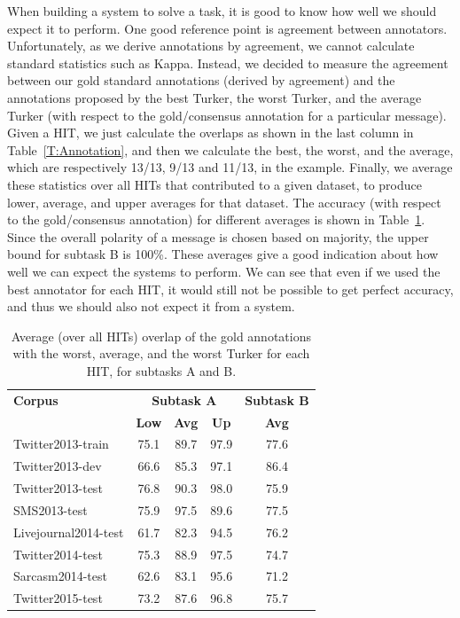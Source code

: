 \documentclass[11pt]{article}
\begin{document}
When building a system to solve a task, it is good to know how well we should expect it to perform. One good reference point is agreement between annotators. Unfortunately, as we derive annotations by agreement, we cannot calculate standard statistics such as Kappa. Instead, we decided to measure the agreement between our gold standard annotations (derived by agreement) and the annotations proposed by the best Turker, the worst Turker, and the average Turker (with respect to the gold/consensus annotation for a particular message). Given a HIT, we just calculate the overlaps as shown in the last column in Table~\ref{T:Annotation}, and then we calculate the best, the worst, and the average, which are respectively 13/13, 9/13 and 11/13, in the example. Finally, we average these statistics over all HITs that contributed to a given dataset, to produce lower, average, and upper averages for that dataset.
The accuracy (with respect to the gold/consensus annotation) for different averages is shown in Table~\ref{T:bounds}. Since the overall polarity of a message is chosen based on majority, the upper bound for subtask B is 100\%. These averages give a good indication about how well we can expect the systems to perform. We can see that even if we used the best annotator for each HIT, it would still not be possible to get perfect accuracy, and thus we should also not expect it from a system.





\begin{table}[h]
\small
\begin{center}
\begin{tabular}{ l  c  c  c  c }
\hline
\bf Corpus & \multicolumn{3}{c}{\bf Subtask A} & \multicolumn{1}{c}{\bf Subtask B} \\
& \bf Low & \bf Avg & \bf Up & \multicolumn{1}{c}{\bf Avg} \\
\hline
Twitter2013-train & 75.1 & 89.7 & 97.9 & 77.6 \\
Twitter2013-dev & 66.6 & 85.3 & 97.1 & 86.4 \\
Twitter2013-test & 76.8 & 90.3 & 98.0 & 75.9 \\
SMS2013-test & 75.9 & 97.5 & 89.6 & 77.5 \\
\footnotesize{Livejournal2014-test} & 61.7 & 82.3 & 94.5 & 76.2 \\
Twitter2014-test & 75.3 & 88.9 & 97.5 & 74.7 \\
Sarcasm2014-test & 62.6 & 83.1 & 95.6 & 71.2 \\
Twitter2015-test & 73.2 & 87.6 & 96.8 & 75.7 \\
\hline
\end{tabular}
\caption{Average (over all HITs) overlap of the gold annotations with the worst, average, and the worst Turker for each HIT, for subtasks A and B.}
\label{T:bounds}
\end{center}
\end{table}
\end{document}
